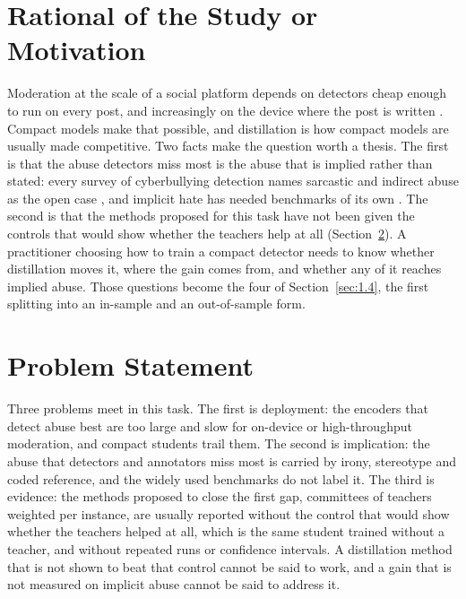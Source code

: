 \section{Rational of the Study or Motivation}
\label{sec:1.2}
Moderation at the scale of a social platform depends on detectors cheap enough to run on every post,
and increasingly on the device where the post is written \cite{zhou2019edge, schwartz2020green}.
Compact models make that possible, and distillation is how compact models are usually made
competitive. Two facts make the question worth a thesis. The first is that the abuse detectors miss
most is the abuse that is implied rather than stated: every survey of cyberbullying detection names
sarcastic and indirect abuse as the open case \cite{rosa2019automatic, salawu2020approaches,
emmery2021current}, and implicit hate has needed benchmarks of its own \cite{elsherief2021latent,
ocampo2023indepth}. The second is that the methods proposed for this task have not been given the
controls that would show whether the teachers help at all (Section~\ref{sec:1.3}). A practitioner
choosing how to train a compact detector needs to know whether distillation moves it, where the gain
comes from, and whether any of it reaches implied abuse. Those questions become the four of
Section~\ref{sec:1.4}, the first splitting into an in-sample and an out-of-sample form.

\section{Problem Statement}
\label{sec:1.3}
Three problems meet in this task. The first is deployment: the encoders that detect abuse best are too
large and slow for on-device or high-throughput moderation, and compact students trail them. The second
is implication: the abuse that detectors and annotators miss most is carried by irony, stereotype and
coded reference, and the widely used benchmarks do not label it. The third is evidence: the methods
proposed to close the first gap, committees of teachers weighted per instance, are usually reported
without the control that would show whether the teachers helped at all, which is the same student
trained without a teacher, and without repeated runs or confidence intervals. A distillation method that is not shown to beat that control cannot be said to work, and
a gain that is not measured on implicit abuse cannot be said to address it.

